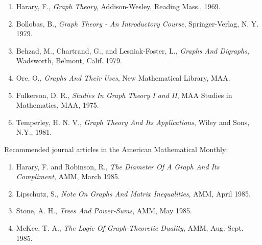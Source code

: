 \documentclass{article}
\begin{document}
\begin{enumerate}[1.]
  \item Harary, F., \emph{Graph Theory}, Addison-Wesley, Reading Mass., 1969.
  \item Bollobas, B., \emph{Graph Theory - An Introductory Course}, Springer-Verlag, N. Y. 1979.
  \item Behzad, M., Chartrand, G., and Lesniak-Foster, L., \emph{Graphs And Digraphs}, Wadsworth, Belmont, Calif. 1979.
  \item Ore, O., \emph{Graphs And Their Uses}, New Mathematical Library, MAA.
  \item Fulkerson, D. R., \emph{Studies In Graph Theory I and II}, MAA Studies in Mathematics, MAA, 1975.
  \item Temperley, H. N. V., \emph{Graph Theory And Its Applications}, Wiley and Sons, N.Y., 1981.
\end{enumerate}

\noindent Recommended journal articles in the American Mathematical Monthly:

\begin{enumerate}[1.]
  \item Harary, F. and Robinson, R., \emph{The Diameter Of A Graph And Its Compliment}, AMM, March 1985.
  \item Lipschutz, S., \emph{Note On Graphs And Matrix Inequalities}, AMM, April 1985.
  \item Stone, A. H., \emph{Trees And Power-Sums}, AMM, May 1985.
  \item McKee, T. A., \emph{The Logic Of Graph-Theoretic Duality}, AMM, Aug.-Sept. 1985.
\end{enumerate}
\end{document}
